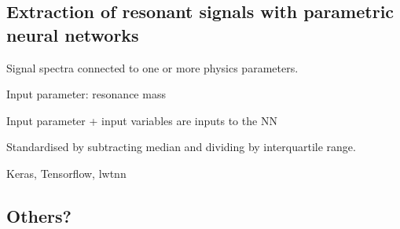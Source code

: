 




\subsection{Extraction of resonant signals with parametric neural networks}
\label{sec:mva_pnn}

Signal spectra connected to one or more physics parameters.

Input parameter: resonance mass \mX

Input parameter + input variables are inputs to the NN

Standardised by subtracting median and dividing by interquartile range.

Keras, Tensorflow, lwtnn






\subsection{Others?}



